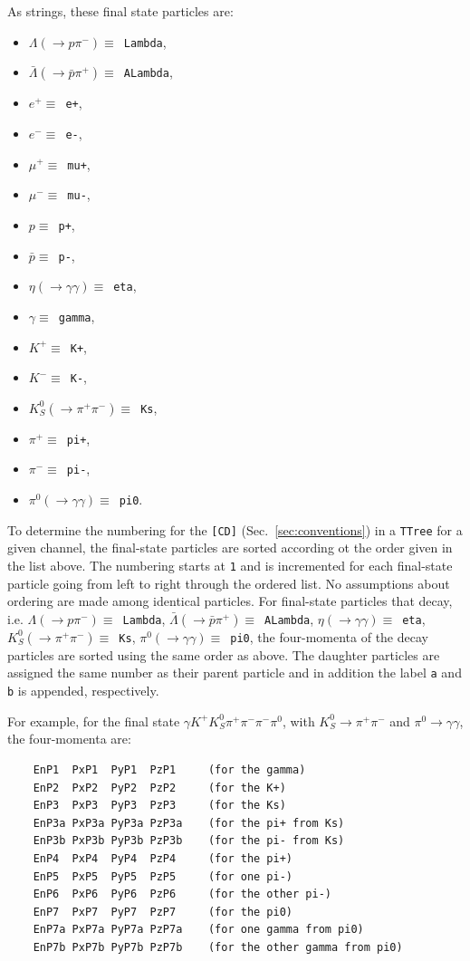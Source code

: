 \documentclass[11pt]{article}
\begin{document}
As strings, these final state particles are:
\begin{itemize}
\item $\Lambda (\to p \pi^-) \equiv $~{\tt Lambda}, 
\item $\bar{\Lambda} (\to \bar{p} \pi^+) \equiv $~{\tt ALambda}, 
\item $e^+ \equiv $~{\tt e+}, 
\item $e^- \equiv $~{\tt e-}, 
\item $\mu^+ \equiv $~{\tt mu+},  
\item $\mu^- \equiv $~{\tt mu-}, 
\item $p \equiv $~{\tt p+}, 
\item $\bar{p} \equiv $~{\tt p-}, 
\item $\eta (\to \gamma\gamma) \equiv $~{\tt eta}, 
\item $\gamma \equiv $~{\tt gamma}, 
\item $K^+ \equiv $~{\tt K+}, 
\item $K^- \equiv $~{\tt K-}, 
\item $K^0_S (\to \pi^+\pi^-) \equiv $~{\tt Ks}, 
\item $\pi^+ \equiv $~{\tt pi+}, 
\item $\pi^- \equiv $~{\tt pi-}, 
\item $\pi^0 (\to \gamma\gamma) \equiv $~{\tt pi0}.
\end{itemize}

To determine the numbering for the {\tt [CD]} (Sec.~\ref{sec:conventions}) in a {\tt TTree} for a given channel, the final-state particles are sorted according ot the order given in the list above.  The numbering starts at {\tt 1} and is incremented for each final-state particle going from left to right through the ordered list.  No assumptions about ordering are made among identical particles.  For final-state particles that decay, i.e. $\Lambda (\to p \pi^-) \equiv $~{\tt Lambda}, 
$\bar{\Lambda} (\to \bar{p} \pi^+) \equiv $~{\tt ALambda}, $\eta (\to \gamma\gamma) \equiv $~{\tt eta}, $K^0_S (\to \pi^+\pi^-) \equiv $~{\tt Ks}, $\pi^0 (\to \gamma\gamma) \equiv $~{\tt pi0}, the four-momenta of the decay particles are sorted using the same order as above.  The daughter particles are assigned the same number as their parent particle and in addition the label {\tt a} and {\tt b} is appended, respectively.

For example, for the final state $\gamma K^+ K^0_S \pi^+ \pi^- \pi^- \pi^0$, with $K^0_S \to \pi^+ \pi^-$ and $\pi^0 \to \gamma \gamma$, the four-momenta are:
\begin{verbatim}
    EnP1  PxP1  PyP1  PzP1     (for the gamma)
    EnP2  PxP2  PyP2  PzP2     (for the K+)
    EnP3  PxP3  PyP3  PzP3     (for the Ks)
    EnP3a PxP3a PyP3a PzP3a    (for the pi+ from Ks)
    EnP3b PxP3b PyP3b PzP3b    (for the pi- from Ks)
    EnP4  PxP4  PyP4  PzP4     (for the pi+)
    EnP5  PxP5  PyP5  PzP5     (for one pi-)
    EnP6  PxP6  PyP6  PzP6     (for the other pi-)
    EnP7  PxP7  PyP7  PzP7     (for the pi0)
    EnP7a PxP7a PyP7a PzP7a    (for one gamma from pi0)
    EnP7b PxP7b PyP7b PzP7b    (for the other gamma from pi0)
\end{verbatim}
\end{document}
